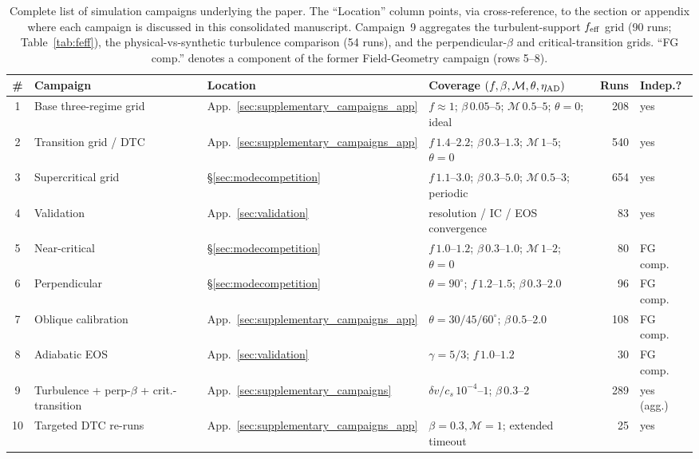 \documentclass[usenatbib,twoside,twocolumn]{mnras}
\begin{document}
\begin{table}
\caption{Complete list of simulation campaigns underlying the paper. The ``Location'' column points, via cross-reference, to the section or appendix where each campaign is discussed in this consolidated manuscript. Campaign~9 aggregates the turbulent-support $f_{\rm eff}$ grid (90 runs; Table~\ref{tab:feff}), the physical-vs-synthetic turbulence comparison (54 runs), and the perpendicular-$\beta$ and critical-transition grids. ``FG comp.'' denotes a component of the former Field-Geometry campaign (rows 5--8).}
\label{tab:campaigns}
\footnotesize
\setlength{\tabcolsep}{4pt}
\renewcommand{\arraystretch}{1.0}
\begin{tabular}{@{}c p{3.4cm} l p{4.0cm} r l@{}}
\toprule
\# & Campaign & Location & Coverage $(f,\beta,\mathcal{M},\theta,\eta_{\rm AD})$ & Runs & Indep.? \\
\midrule
1  & Base three-regime grid & App.~\ref{sec:supplementary_campaigns_app} & $f\approx1$; $\beta\,0.05$--$5$; $\mathcal{M}\,0.5$--$5$; $\theta=0$; ideal & 208 & yes \\
2  & Transition grid / DTC & App.~\ref{sec:supplementary_campaigns_app} & $f\,1.4$--$2.2$; $\beta\,0.3$--$1.3$; $\mathcal{M}\,1$--$5$; $\theta=0$ & 540 & yes \\
3  & Supercritical grid & \S\ref{sec:modecompetition} & $f\,1.1$--$3.0$; $\beta\,0.3$--$5.0$; $\mathcal{M}\,0.5$--$3$; periodic & 654 & yes \\
4  & Validation & App.~\ref{sec:validation} & resolution / IC / EOS convergence & 83 & yes \\
5  & Near-critical & \S\ref{sec:modecompetition} & $f\,1.0$--$1.2$; $\beta\,0.3$--$1.0$; $\mathcal{M}\,1$--$2$; $\theta=0$ & 80 & FG comp. \\
6  & Perpendicular & \S\ref{sec:modecompetition} & $\theta=90^\circ$; $f\,1.2$--$1.5$; $\beta\,0.3$--$2.0$ & 96 & FG comp. \\
7  & Oblique calibration & App.~\ref{sec:supplementary_campaigns_app} & $\theta=30/45/60^\circ$; $\beta\,0.5$--$2.0$ & 108 & FG comp. \\
8  & Adiabatic EOS & App.~\ref{sec:validation} & $\gamma=5/3$; $f\,1.0$--$1.2$ & 30 & FG comp. \\
9  & Turbulence + perp-$\beta$ + crit.-transition & App.~\ref{sec:supplementary_campaigns} & $\delta v/c_s\,10^{-4}$--$1$; $\beta\,0.3$--$2$ & 289 & yes (agg.) \\
10 & Targeted DTC re-runs & App.~\ref{sec:supplementary_campaigns_app} & $\beta=0.3,\mathcal{M}=1$; extended timeout & 25 & yes \\

\end{tabular}
\end{table}
\end{document}
